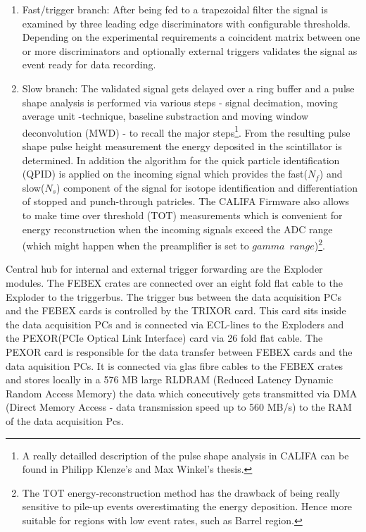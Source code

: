 \begin{enumerate}
\item Fast/trigger branch: After being fed to a trapezoidal filter the signal is examined by three leading edge discriminators with configurable thresholds. Depending on the experimental requirements a coincident matrix between one or more discriminators and optionally external triggers validates the signal as event ready for data recording.
\item Slow branch: The validated signal gets delayed over a ring buffer and a pulse shape analysis is performed via various steps - signal decimation, moving average unit -technique, baseline substraction and moving window deconvolution (MWD) - to recall the major steps\footnote{A really detailled description of the pulse shape analysis in CALIFA can be found in Philipp Klenze's\cite{pklenze} and Max Winkel's thesis\cite{winkel2016komplexe}.}. From the resulting pulse shape pulse height measurement the energy deposited in the scintillator is determined. In addition the algorithm for the quick particle identification (QPID) is applied on the incoming signal which provides the fast($N_{f}$) and slow($N_{s}$) component of the signal for isotope identification and differentiation of stopped and punch-through patricles. The CALIFA Firmware also allows to make time over threshold (TOT) measurements which is convenient for energy reconstruction when the incoming signals exceed the ADC range (which might happen when the preamplifier is set to $gamma \enspace range$)\footnote{The TOT energy-reconstruction method has the drawback of being really sensitive to pile-up events overestimating the energy deposition. Hence more suitable for regions with low event rates, such as Barrel region.}.
\end{enumerate}
Central hub for internal and external trigger forwarding are the Exploder modules\cite{exploder:gsi}. The FEBEX crates are connected over an eight fold flat cable to the Exploder to the triggerbus. The trigger bus between the data acquisition PCs and the FEBEX cards is controlled by the TRIXOR card. This card sits inside the data acquisition PCs and is connected via ECL-lines to the Exploders and the PEXOR(PCIe Optical Link Interface) card via 26 fold flat cable. The PEXOR card is responsible for the data transfer between FEBEX cards and the data aquisition PCs. It is connected via glas fibre cables to the FEBEX crates and stores locally in a 576 MB large RLDRAM (Reduced Latency Dynamic Random Access Memory) the data which conecutively gets transmitted  via DMA (Direct Memory Access - data transmission speed up to 560 MB/s) to the RAM of the data acquisition Pcs.\newline

